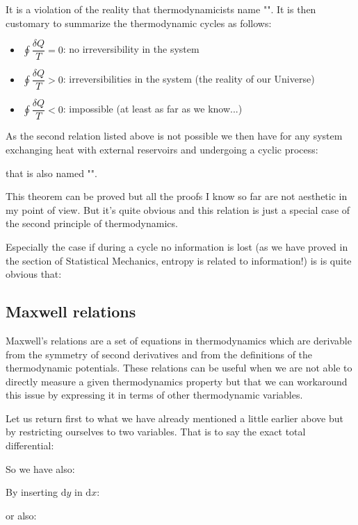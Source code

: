 	It is a violation of the reality that thermodynamicists name "". It is then customary to summarize the thermodynamic cycles as follows:
	\begin{itemize}
		\item $\displaystyle\oint\dfrac{\delta Q}{T}=0$: no irreversibility in the system
	
		\item $\displaystyle\oint\dfrac{\delta Q}{T}>0$: irreversibilities in the system (the reality of our Universe)

		\item $\displaystyle\oint\dfrac{\delta Q}{T}<0$: impossible (at least as far as we know...)
	\end{itemize}
	As the second relation listed above is not possible we then have for any system exchanging heat with external reservoirs and undergoing a cyclic process:
	
	that is also named "".

	This theorem can be proved but all the proofs I know so far are not aesthetic in my point of view. But it's quite obvious and this relation is just a special case of the second principle of thermodynamics.

	Especially the case if during a cycle no information is lost (as we have proved in the section of Statistical Mechanics, entropy is related to information!) is is quite obvious that:
	
	
	\subsection{Maxwell relations}
	Maxwell's relations are a set of equations in thermodynamics which are derivable from the symmetry of second derivatives and from the definitions of the thermodynamic potentials. These relations can be useful when we are not able to directly measure a given thermodynamics property but that we can workaround this issue by expressing it in terms of other thermodynamic variables.
	
	Let us return first to what we have already mentioned a little earlier above but by restricting ourselves to two variables. That is to say the exact total differential:
	
	So we have also:
	
	By inserting $\mathrm{d}y$ in $\mathrm{d}x$:
	
	or also:
	
